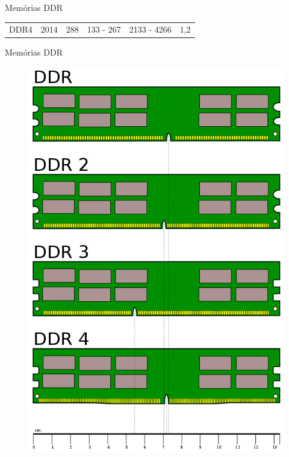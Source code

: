 \documentclass[aspectratio=169,
				xcolor=table]{beamer}
\begin{document}
\begin{frame}{Memórias DDR}
\begin{eftable}
{\begin{tabular}{cccccc}
				DDR4                        & 2014                                                                                & 288                                                                                          & 133 - 267                                                                                   & 2133 - 4266                                                                             & 1,2                                                                                     
			\end{tabular}
			}
		\end{eftable}
	\end{frame}
	
	\begin{frame}{Memórias DDR}
		\begin{figure}[hbtp]
		\centering
		\includegraphics[height=0.8\textheight, keepaspectratio]{../figs/cap07/ddr.png}
		\end{figure}
		
	\end{frame}
	
\end{document}
